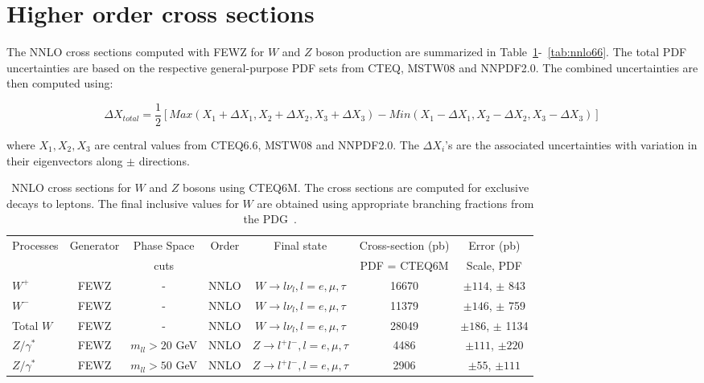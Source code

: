 \section{Higher order cross sections}
\label{sec:results}
The NNLO cross sections computed with FEWZ for $W$ and $Z$ boson production 
are summarized in Table~\ref{tab:nnlo}-~\ref{tab:nnlo66}. The total PDF uncertainties are based on 
the respective general-purpose PDF sets from CTEQ, MSTW08 and NNPDF2.0. 
The combined uncertainties are then computed using:

\begin{equation}
   \Delta X_{total} =  \frac{1}{2} [Max(X_1 + \Delta X_1, X_2 + \Delta X_2, X_3 + \Delta X_3 ) - Min(X_1 - \Delta X_1, X_2 - \Delta X_2, X_3 - \Delta X_3) ]
\end{equation}

where $X_1, X_2, X_3$ are central values from  CTEQ6.6, MSTW08 and NNPDF2.0. The $\Delta X_i$'s are the
associated uncertainties with variation in their eigenvectors along $\pm$ directions.

\vspace{3mm}
\begin{table}[hbt]
\begin{center}
\renewcommand{\arraystretch}{1.2}
\begin{tabular}{|l|c|c|c|c|c|c|}\hline
Processes & Generator & Phase Space& Order & Final state & Cross-section (pb)& Error (pb) \\ 
 &  &  cuts & & & PDF = CTEQ6M & Scale, PDF \\ \hline
$W^+$ & FEWZ & - & NNLO & $W \rightarrow l \nu_l, l=e,\mu,\tau$ & 16670 & $\pm 114$, $\pm$ 843 \\ \hline
$W^-$ & FEWZ & - & NNLO & $W \rightarrow l \nu_l, l=e,\mu,\tau$ & 11379 & $\pm 146$, $\pm$ 759 \\ \hline
Total $W$ & FEWZ & - & NNLO & $W \rightarrow l \nu_l, l=e,\mu,\tau$ & 28049 & $\pm 186$, $\pm$ 1134 \\ \hline
$Z/\gamma^*$ & FEWZ & $m_{ll} > 20$ GeV & NNLO & $Z \rightarrow l^+l^-, l=e,\mu,\tau$ & 4486 & $\pm 111$, $\pm 220$ \\ \hline
$Z/\gamma^*$ & FEWZ & $m_{ll} > 50$ GeV & NNLO & $Z \rightarrow l^+l^-, l=e,\mu,\tau$ & 2906 & $\pm 55$, $\pm 111$ \\ \hline
\end{tabular} 
\caption{NNLO cross sections for $W$ and $Z$ bosons using CTEQ6M. The cross sections are computed for
exclusive decays to leptons. The final inclusive values for $W$ are obtained using appropriate 
branching fractions from the PDG~\cite{pdg}. \label{tab:nnlo}}
\end{center}
\end{table}


